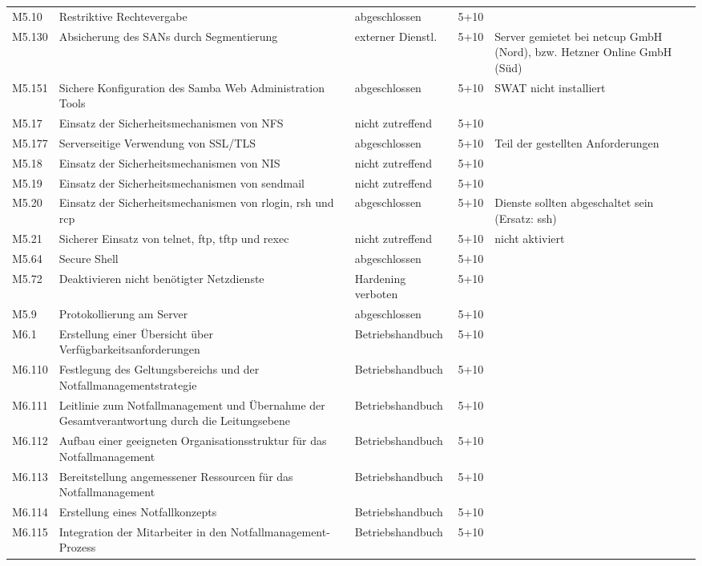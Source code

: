 \begin{longtable}{lp{3.7cm}|p{3cm}l|p{3.8cm}}
M5.10 & Restriktive Rechtevergabe & abgeschlossen & 5+10 &  \\
M5.130 & Absicherung des SANs durch Segmentierung & externer Dienstl. & 5+10 & Server gemietet bei netcup GmbH (Nord), bzw. Hetzner Online GmbH (Süd) \\
M5.151 & Sichere Konfiguration des Samba Web Administration Tools & abgeschlossen & 5+10 & SWAT nicht installiert \\
M5.17 & Einsatz der Sicherheitsmechanismen von NFS & nicht zutreffend & 5+10 &  \\
M5.177 & Serverseitige Verwendung von SSL/TLS & abgeschlossen & 5+10 & Teil der gestellten Anforderungen \\
M5.18 & Einsatz der Sicherheitsmechanismen von NIS & nicht zutreffend & 5+10 &  \\
M5.19 & Einsatz der Sicherheitsmechanismen von sendmail & nicht zutreffend & 5+10 &  \\
M5.20 & Einsatz der Sicherheitsmechanismen von rlogin, rsh und rcp & abgeschlossen & 5+10 & Dienste sollten abgeschaltet sein (Ersatz: ssh) \\
M5.21 & Sicherer Einsatz von telnet, ftp, tftp und rexec & nicht zutreffend & 5+10 & nicht aktiviert \\
M5.64 & Secure Shell & abgeschlossen & 5+10 &  \\
M5.72 & Deaktivieren nicht benötigter Netzdienste & Hardening verboten & 5+10 &  \\
M5.9 & Protokollierung am Server & abgeschlossen & 5+10 &  \\
M6.1 & Erstellung einer Übersicht über Verfügbarkeitsanforderungen & Betriebshandbuch & 5+10 &  \\
M6.110 & Festlegung des Geltungsbereichs und der Notfallmanagementstrategie & Betriebshandbuch & 5+10 &  \\
M6.111 & Leitlinie zum Notfallmanagement und Übernahme der Gesamtverantwortung durch die Leitungsebene & Betriebshandbuch & 5+10 &  \\
M6.112 & Aufbau einer geeigneten Organisationsstruktur für das Notfallmanagement & Betriebshandbuch & 5+10 &  \\
M6.113 & Bereitstellung angemessener Ressourcen für das Notfallmanagement & Betriebshandbuch & 5+10 &  \\
M6.114 & Erstellung eines Notfallkonzepts & Betriebshandbuch & 5+10 &  \\
M6.115 & Integration der Mitarbeiter in den Notfallmanagement-Prozess & Betriebshandbuch & 5+10 &  \\

\end{longtable}
